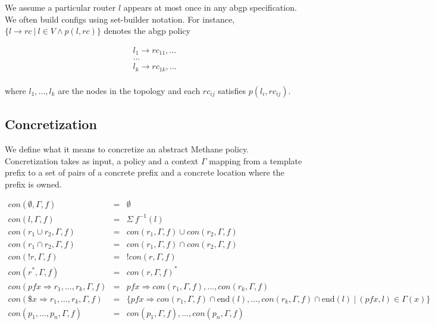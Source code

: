 \documentclass[twocolumn, openany]{sig-alternate-10pt}
\newcommand{\sysname}{{\small \sf Methane}\xspace}
\begin{document}
\vspace{1em}

We assume a particular router $l$ appears at most once in any abgp specification.
We often build configs using set-builder notation.  For instance,
$\{l \rightarrow rc ~\vert~ l \in V \wedge p(l,rc)\}$ denotes the abgp policy

\[ \begin{array}{c}
  l_1 \rightarrow rc_{11},... \\
  ...           \\
  l_k \rightarrow rc_{1k},... \\
\end{array} \]


where $l_1, ..., l_k$ are the nodes in the topology
and each $rc_{ij}$ satisfies $p(l_i,rc_{ij})$.


\subsection{Concretization}

We define what it means to concretize an abstract \sysname policy. 
Concretization takes as input, a policy and a context $\Gamma$ mapping from a template prefix to a set of pairs of a concrete prefix and a concrete location where the prefix is owned.

\[ \begin{array}{lcl}
  con(\emptyset,\Gamma,f)                        & = & \emptyset \\
  con(l,\Gamma,f)                                & = & \Sigma ~ f^{-1}(l) \\
  con(r_1 \cup r_2,\Gamma,f)                     & = & con(r_1,\Gamma,f) \cup con(r_2,\Gamma,f) \\
  con(r_1 \cap r_2,\Gamma,f)                     & = & con(r_1,\Gamma,f) \cap con(r_2,\Gamma,f) \\
  con(!r,\Gamma,f)                               & = & !con(r,\Gamma,f) \\
  con(r^*,\Gamma,f)                              & = & con(r,\Gamma,f)^* \\
  con(pfx \Rightarrow r_1, \dots, r_k,\Gamma,f)  & = & pfx \Rightarrow con(r_1,\Gamma,f), \dots, con(r_k,\Gamma,f) \\
  con(\$x \Rightarrow r_1, \dots, r_k,\Gamma,f)  & = & 
       \{ pfx \Rightarrow con(r_1,\Gamma,f) \cap \text{end}(l), 
          \dots, 
          con(r_k,\Gamma,f) \cap \text{end}(l) ~\vert~ (pfx,l) \in \Gamma(x) \} \\
  con(p_1, \dots, p_n, \Gamma, f)                & = & con(p_1,\Gamma,f), \dots, con(p_n,\Gamma,f) \\
\end{array} \]
\end{document}
